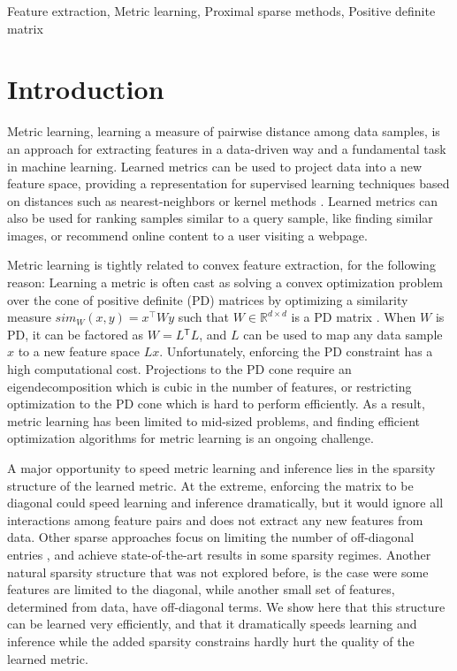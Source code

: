 \documentclass[twoside,11pt]{article}
\newcommand\mat[1]{{#1}}
\newcommand{\T}{{}^\mathsf{T}}
\newcommand{\W}{\mat{W}}
\newcommand{\R}{\mathbb{R}}
\newcommand{\cholL}{\mat{L}}
\begin{document}
\begin{keywords}
  Feature extraction, Metric learning, Proximal sparse methods, Positive definite matrix 
\end{keywords}

\section{Introduction}
\vskip -5pt
Metric learning, learning a measure of pairwise distance among data samples, is an approach for extracting features in a data-driven way and a fundamental task in machine learning. Learned metrics can be used to project data into a new feature space, providing a representation for supervised learning techniques based on distances such as nearest-neighbors or kernel methods \citep{kulis2012survey}.
Learned metrics can also be used for ranking samples similar to a query sample, like finding similar images, or recommend online content to a user visiting a webpage. 

Metric learning is tightly related to convex feature extraction, for the following reason: Learning a metric is often cast as solving a convex optimization problem over the cone of positive definite (PD) matrices by optimizing a similarity measure $sim_W (x,y) = x^\top W y$ such that $W \in \R^{d \times d}$ is a PD matrix  \citep{kulis2012survey,bellet2013survey}. 
When $\W$ is PD, it can be factored as $\W= \cholL\T \cholL$, and $\cholL$ can be used to map any data sample $x$ to a new feature space $\cholL x$. Unfortunately, enforcing the PD constraint has a high computational cost. Projections to the PD cone require an eigendecomposition which is cubic in the number of features, or restricting optimization to the PD cone which is hard to perform efficiently. As a result, metric learning has been limited to mid-sized problems, and finding efficient optimization algorithms for metric learning is an ongoing challenge. 

A major opportunity to speed metric learning and inference lies in the sparsity structure of the learned metric. At the extreme, enforcing the matrix to be diagonal could speed learning and inference dramatically, but it would ignore all interactions among feature pairs and does not extract any new features from data. Other sparse approaches focus on limiting the number of off-diagonal entries \citep{HDSL}, and achieve state-of-the-art results in some sparsity regimes. Another natural sparsity structure that was not explored before, is the case were some features are limited to the diagonal, while another small set of features, determined from data, have off-diagonal terms. We show here that this structure can be learned very efficiently, and that it dramatically speeds learning and inference while the added sparsity constrains hardly hurt the quality of the learned metric.
\end{document}
